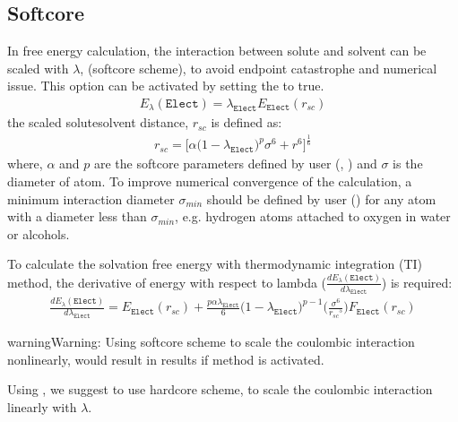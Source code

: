 \documentclass[letterpaper,10pt,english]{sphinxmanual}
\begin{document}
\subsection{Soft\sphinxhyphen{}core}
\label{\detokenize{free_energy:id1}}
\sphinxAtStartPar
In free energy calculation, the  interaction between solute and solvent can be scaled with \(\lambda\),  (soft\sphinxhyphen{}core scheme), to avoid
end\sphinxhyphen{}point catastrophe and numerical issue. This option can be activated by setting the  to true.
\begin{equation*}
\begin{split}E_{\lambda}(\texttt{Elect}) = \lambda_{\texttt{Elect}} E_{\texttt{Elect}}(r_{sc})\end{split}
\end{equation*}
\sphinxAtStartPar
the scaled solute\sphinxhyphen{}solvent distance, \(r_{sc}\) is defined as:
\begin{equation*}
\begin{split}r_{sc} = \bigg[\alpha {\big(1 - \lambda_{\texttt{Elect}} \big)}^{p}{\sigma}^6 + {r}^6 \bigg]^{\frac{1}{6}}\end{split}
\end{equation*}
\sphinxAtStartPar
where, \(\alpha\) and \(p\) are the soft\sphinxhyphen{}core parameters defined by user (, ) and \(\sigma\) is the diameter of atom.
To improve numerical convergence of the calculation, a minimum interaction diameter \(\sigma_{min}\) should be defined by user () for any atom with a diameter
less than \(\sigma_{min}\), e.g. hydrogen atoms attached to oxygen in water or alcohols.

\sphinxAtStartPar
To calculate the solvation free energy with thermodynamic integration (TI) method, the derivative of energy with
respect to lambda (\(\frac{dE_{\lambda}(\texttt{Elect})}{d\lambda_{\texttt{Elect}}}\)) is required:
\begin{equation*}
\begin{split}\frac{dE_{\lambda}(\texttt{Elect})}{d\lambda_{\texttt{Elect}}} = E_{\texttt{Elect}}(r_{sc}) + \frac{p \alpha \lambda_{\texttt{Elect}}}{6} \bigg(1 - \lambda_{\texttt{Elect}}\bigg)^{p-1} \bigg(\frac{{\sigma}^6}{{r_{sc}}^5} \bigg) F_{\texttt{Elect}}(r_{sc})\end{split}
\end{equation*}
\begin{sphinxadmonition}{warning}{Warning:}
\sphinxAtStartPar
Using soft\sphinxhyphen{}core scheme to scale the coulombic interaction non\sphinxhyphen{}linearly, would result in  results if  method is activated.

\sphinxAtStartPar
Using , we suggest to use hard\sphinxhyphen{}core scheme, to scale the coulombic interaction linearly with \(\lambda\).
\end{sphinxadmonition}
\end{document}
